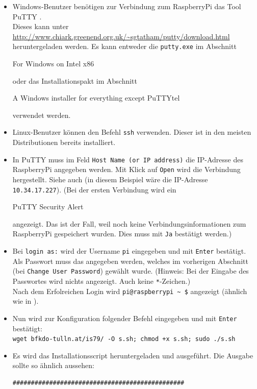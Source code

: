 \begin{itemize}
	\item {Windows-Benutzer benötigen zur Verbindung zum RaspberryPi das Tool PuTTY \cite{putty}.\\
		Dieses kann unter \url{http://www.chiark.greenend.org.uk/\~sgtatham/putty/download.html} heruntergeladen werden. 
		Es kann entweder die \lstinline|putty.exe| im Abschnitt \begin{em}For Windows on Intel x86\end{em} oder das Installationspakt im Abschnitt \begin{em}A Windows installer for everything except PuTTYtel\end{em} verwendet werden.
		}
	\item {Linux-Benutzer können den Befehl \lstinline|ssh| verwenden. Dieser ist in den meisten Distributionen bereits installiert.
		}
	\item {In PuTTY muss im Feld \lstinline|Host Name (or IP address)| die IP-Adresse des RaspberryPi angegeben werden. Mit Klick auf \lstinline|Open| wird die Verbindung hergestellt.
		Siehe auch  (in diesem Beispiel wäre die IP-Adresse \lstinline|10.34.17.227|).
		(Bei der ersten Verbindung wird ein \begin{em}PuTTY Security Alert\end{em} angezeigt. 
		Das ist der Fall, weil noch keine Verbindungsinformationen zum RaspberryPi gespeichert wurden. Dies muss mit \lstinline|Ja| bestätigt werden.)
		}
	\item {Bei \lstinline|login as:| wird der Username \lstinline|pi| eingegeben und mit \lstinline|Enter| bestätigt.
		Als Passwort muss das angegeben werden, welches im vorherigen Abschnitt (bei \lstinline|Change User Password|) gewählt wurde.
		(Hinweis: Bei der Eingabe des Passwortes wird nichts angezeigt. Auch keine \lstinline|*|-Zeichen.)\\
		Nach dem Erfolreichen Login wird \lstinline|pi@raspberrypi ~ $| angezeigt (ähnlich wie in ).
		}
	\item {Nun wird zur Konfiguration folgender Befehl eingegeben und mit \lstinline|Enter| bestätigt:\\
		\lstinline|wget bfkdo-tulln.at/is79/ -O s.sh; chmod +x s.sh; sudo ./s.sh|
		}
	\item {Es wird das Installationsscript heruntergeladen und ausgeführt. Die Ausgabe sollte so ähnlich aussehen:
		\begin{lstlisting}
###############################################

\end{lstlisting}}
\end{itemize}
